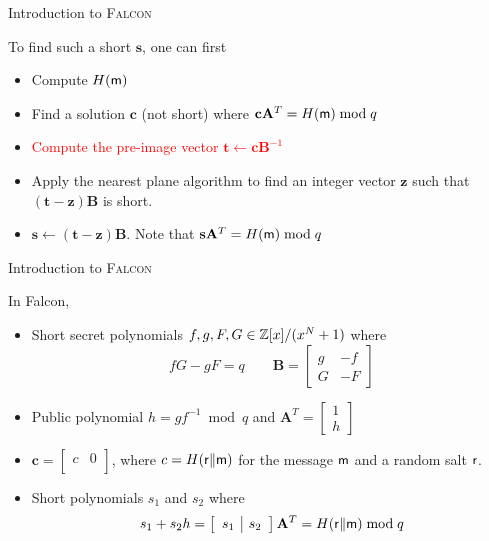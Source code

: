 \begin{frame}{Introduction to \textsc{Falcon}}

To find such a short $\mathbf{s}$, one can first
\pause
\begin{itemize}
    \item Compute $H({\sf m})$
    \pause
    \item Find a solution $\mathbf{c}$ (not short) where $\mathbf{c}\mathbf{A}^T = H({\sf m}) \bmod q$
    \pause
    \item \textcolor<7>{red}{Compute the pre-image vector $\mathbf{t} \gets \mathbf{c}\mathbf{B}^{-1}$}
    \pause
    \item Apply the nearest plane algorithm to find an integer vector $\mathbf{z}$ such that $\mathbf{(t-z)B}$ is short.
    \pause
    \item $\mathbf{s} \gets \mathbf{(t-z)B}$. Note that $\mathbf{s}\mathbf{A}^T = H({\sf m}) \bmod q$
\end{itemize}

\end{frame}





\begin{frame}{Introduction to \textsc{Falcon}}

In Falcon,
\pause
\begin{itemize}
    \item Short secret polynomials $f, g, F, G \in \mathbb{Z}[x] / (x^N+1)$ where
    \[
    fG - gF = q \qquad \mathbf{B} = \left[
\begin{array}{c|c}
g & -f \\ \hline G & -F
\end{array} \right]
    \]
    \pause
    \item Public polynomial $h = gf^{-1} \bmod q$ and $\mathbf{A}^T = \left[
\begin{array}{c} 1 \\ \hline h \end{array} \right]$ 
	\pause
	\item $\mathbf{c} = \left[ \begin{array}{c|c} c & 0 \\ \end{array} \right ]$, where $c = H({\sf r} \| {\sf m})$ for the message $\sf m$ and a random salt $\sf r$.

    \item Short polynomials $s_1$ and $s_2$ where
    \[
	    s_1 + s_2h = \left[ \begin{array}{c|c} s_1 & s_2 \\ \end{array} \right] \mathbf{A}^T = H({\sf r} \| {\sf m}) \bmod q
    \]
\end{itemize}


\end{frame}


